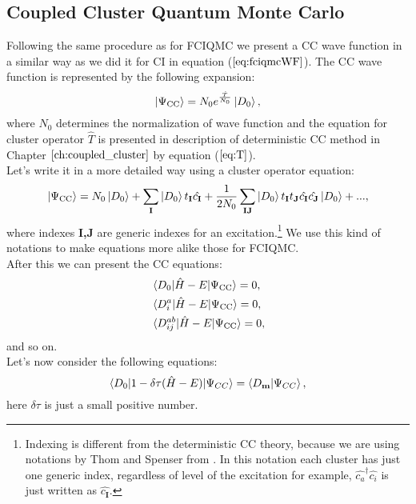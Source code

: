\documentclass[twoside,english]{uiofysmaster}
\theoremstyle{definition}
\begin{document}
\subsection{Coupled Cluster Quantum Monte Carlo}
Following the same procedure as for FCIQMC we present a CC wave function in a similar way as we did it for CI in equation ($\ref{eq:fciqmcWF}$). The CC wave function is represented by the following expansion:
\begin{equation}\label{eq:ccqmcWF}
\ket{\Psi_{\text{CC}}}= N_0 e^{\frac{\hat{T}}{N_0}}\ket{D_0},
\end{equation}
where $N_0$ determines the normalization of wave function and the equation for cluster operator $\hat{T}$ is presented in description of deterministic CC method in Chapter $\ref{ch:coupled_cluster}$ by equation ($\ref{eq:T}$). \\
Let's write it in a more detailed way using a cluster operator equation:
\begin{align}
\ket{\Psi_{\text{CC}}}=N_0\ket{D_0} + \sum_{\textbf{I}} \ket{D_0} t_\textbf{I} \hat{c_\textbf{I}} + \frac{1}{2N_0}
 \sum_{\textbf{IJ}} \ket{D_0} t_\textbf{I} t_\textbf{J}\hat{c_\textbf{I}} \hat{c_\textbf{J}}\ket{D_0} + ...,
\end{align}
where indexes \textbf{I,J} are generic indexes for an excitation.\footnote{Indexing is different from the deterministic CC theory, because we are using notations by Thom and Spenser from \cite{spencerDevelopmentsStochasticCoupled2016}. In this notation each cluster has just one generic index, regardless of level of the excitation for example, $ \hat{c_a}^\dagger \hat{c_i}$ is just written as $\hat{c_\textbf{I}}$.} We use this kind of notations to make equations more alike those for FCIQMC.\\ 
After this we can present the CC equations:
\begin{align}\label{eq:CCQMC1}
&\braket{D_0|\hat{H}-E|\Psi_{\text{CC}}}=0,\\
&\braket{D_i^a|\hat{H}-E|\Psi_{\text{CC}}}=0,\\
&\braket{D_{ij}^{ab}|\hat{H}-E|\Psi_{\text{CC}}}=0,\\
\end{align} 
and so on.\\
Let's now consider the following equations:
\begin{equation}\label{eq::CCQMCproj}
\braket{D_0|1-\delta \tau (\hat{H}-E)|\Psi_{CC}}=\braket{D_\textbf{m}|\Psi_{CC}},
\end{equation}
here $\delta \tau$ is just a small positive number. 
\end{document}
